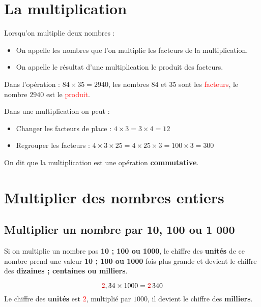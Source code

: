 \documentclass[a4paper,dvipsnames]{article}
\begin{document}
\section{La multiplication}

\begin{Voc}
Lorsqu'on multiplie deux nombres :
\begin{itemize}
\item On appelle les nombres que l’on multiplie les facteurs de la multiplication.
\item On appelle le résultat d’une multiplication le produit des facteurs.
\end{itemize}
\end{Voc}

\begin{Ex}
Dans l'opération : $84\times35=2940$, les nombres $84$ et $35$ sont les \textcolor{red}{facteurs}, le nombre $2940$ est le \textcolor{red}{produit}.
\end{Ex}

\begin{Pp}
Dans une multiplication on peut :
\begin{itemize}
    \item Changer les facteurs de place : $4\times3=3\times4=12$
    \item Regrouper les facteurs : $4\times3\times25=4\times25\times3=100\times3=300$
\end{itemize}
On dit que la multiplication est une opération \textbf{commutative}.
\end{Pp}

\section{Multiplier des nombres entiers}

\subsection{Multiplier un nombre par 10, 100 ou 1 000}

\begin{Mt}
Si on multiplie un nombre pas \textbf{10 ; 100 ou 1000}, le chiffre des \textbf{unités} de ce nombre prend une valeur \textbf{10 ; 100 ou 1000} fois plus grande et devient le chiffre des \textbf{dizaines ; centaines ou milliers}.
\end{Mt}

\begin{Ex}
\[\textcolor{red}{2},34\times1000=\textcolor{red}{2}\,340\]
Le chiffre des \textbf{unités} est \textcolor{red}{$2$}, multiplié par $1000$, il devient le chiffre des \textbf{milliers}.
\end{Ex} 
\end{document}
